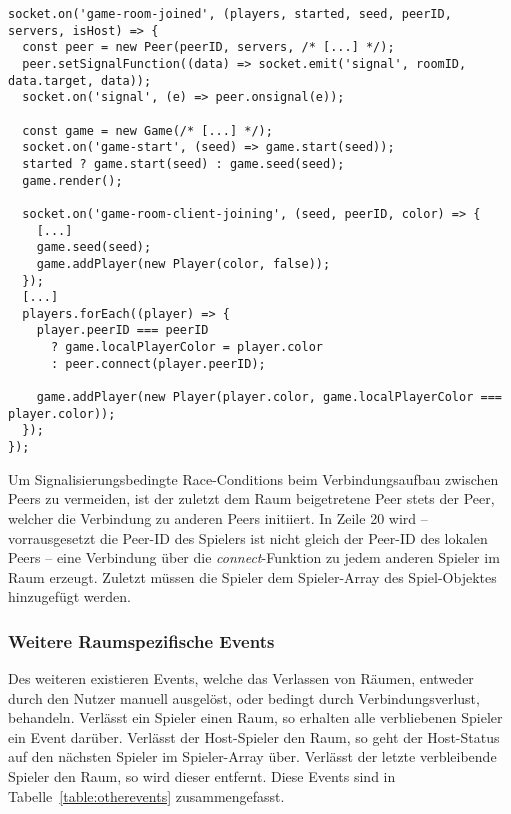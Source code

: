 \vspace{11pt}
\lstset{language=js, style=STYLE_CODE_JS}
\begin{singlespace}
\begin{lstlisting}[caption={Raumbeitritt auf der Client-Seite -- game.js}, captionpos=b, label={lst:clientroomjoin}]
socket.on('game-room-joined', (players, started, seed, peerID, servers, isHost) => {
  const peer = new Peer(peerID, servers, /* [...] */);
  peer.setSignalFunction((data) => socket.emit('signal', roomID, data.target, data)); 
  socket.on('signal', (e) => peer.onsignal(e));

  const game = new Game(/* [...] */);
  socket.on('game-start', (seed) => game.start(seed));
  started ? game.start(seed) : game.seed(seed);
  game.render();

  socket.on('game-room-client-joining', (seed, peerID, color) => {
	[...]
    game.seed(seed);
    game.addPlayer(new Player(color, false));
  });
  [...]
  players.forEach((player) => {
    player.peerID === peerID 
      ? game.localPlayerColor = player.color 
      : peer.connect(player.peerID);
      
    game.addPlayer(new Player(player.color, game.localPlayerColor === player.color));
  });
});
\end{lstlisting}
\end{singlespace}

Um Signalisierungsbedingte \glqq{}Race-Conditions\grqq{} beim Verbindungsaufbau zwischen Peers zu vermeiden, ist der zuletzt dem Raum beigetretene Peer stets der Peer, welcher die Verbindung zu anderen Peers initiiert. In Zeile 20 wird -- vorrausgesetzt die Peer-ID des Spielers ist nicht gleich der Peer-ID des lokalen Peers -- eine Verbindung über die \textit{connect}-Funktion zu jedem anderen Spieler im Raum erzeugt. Zuletzt müssen die Spieler dem Spieler-Array des Spiel-Objektes hinzugefügt werden.

\subsubsection{Weitere Raumspezifische Events}
Des weiteren existieren Events, welche das Verlassen von Räumen, entweder durch den Nutzer manuell ausgelöst, oder bedingt durch Verbindungsverlust, behandeln. Verlässt ein Spieler einen Raum, so erhalten alle verbliebenen Spieler ein Event darüber. Verlässt der Host-Spieler den Raum, so geht der Host-Status auf den nächsten Spieler im Spieler-Array über. Verlässt der letzte verbleibende Spieler den Raum, so wird dieser entfernt. Diese Events sind in Tabelle~\ref{table:otherevents} zusammengefasst.\par

